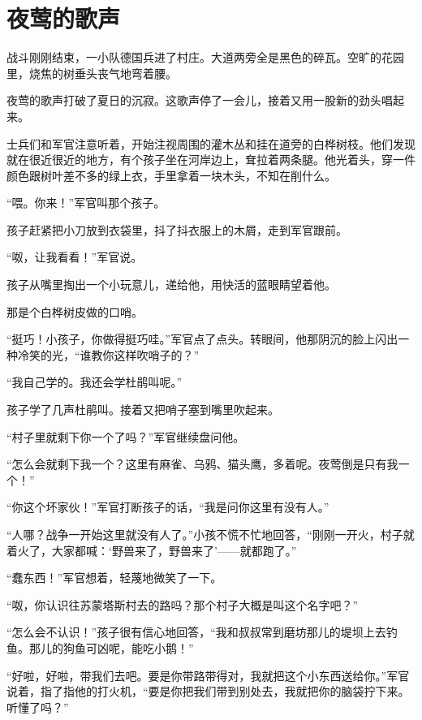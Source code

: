 \documentclass[12pt,UTF-8,openany]{ctexbook}
\begin{document}
\chapter{夜莺的歌声}

\begin{large}
    
    战斗刚刚结束，一小队德国兵进了村庄。大道两旁全是黑色的碎瓦。空旷的花园里，烧焦的树垂头丧气地弯着腰。
    
    夜莺的歌声打破了夏日的沉寂。这歌声停了一会儿，接着又用一股新的劲头唱起来。
    
    士兵们和军官注意听着，开始注视周围的灌木丛和挂在道旁的白桦树枝。他们发现就在很近很近的地方，有个孩子坐在河岸边上，耷拉着两条腿。他光着头，穿一件颜色跟树叶差不多的绿上衣，手里拿着一块木头，不知在削什么。
    
    “喂。你来！”军官叫那个孩子。
    
    孩子赶紧把小刀放到衣袋里，抖了抖衣服上的木屑，走到军官跟前。
    
    “呶，让我看看！”军官说。
    
    孩子从嘴里掏出一个小玩意儿，递给他，用快活的蓝眼睛望着他。
    
    那是个白桦树皮做的口哨。
    
    “挺巧！小孩子，你做得挺巧哇。”军官点了点头。转眼间，他那阴沉的脸上闪出一种冷笑的光，“谁教你这样吹哨子的？”
    
    “我自己学的。我还会学杜鹃叫呢。”
    
    孩子学了几声杜鹃叫。接着又把哨子塞到嘴里吹起来。
    
    “村子里就剩下你一个了吗？”军官继续盘问他。
    
    “怎么会就剩下我一个？这里有麻雀、乌鸦、猫头鹰，多着呢。夜莺倒是只有我一个！”
    
    “你这个坏家伙！”军官打断孩子的话，“我是问你这里有没有人。”
    
    “人哪？战争一开始这里就没有人了。”小孩不慌不忙地回答，“刚刚一开火，村子就着火了，大家都喊：‘野兽来了，野兽来了’——就都跑了。”
    
    “蠢东西！”军官想着，轻蔑地微笑了一下。
    
    “呶，你认识往苏蒙塔斯村去的路吗？那个村子大概是叫这个名字吧？”
    
    “怎么会不认识！”孩子很有信心地回答，“我和叔叔常到磨坊那儿的堤坝上去钓鱼。那儿的狗鱼可凶呢，能吃小鹅！”
    
    “好啦，好啦，带我们去吧。要是你带路带得对，我就把这个小东西送给你。”军官说着，指了指他的打火机，“要是你把我们带到别处去，我就把你的脑袋拧下来。听懂了吗？”
    

\end{large}
\end{document}
